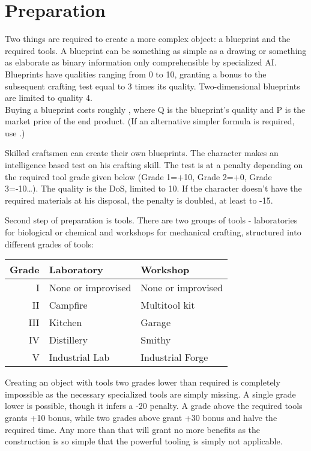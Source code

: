 \documentclass[12pt,a4paper,openany,usenames,dvipsnames]{book}
\begin{document}
	\chapter{Preparation}
	Two things are required to create a more complex object: a blueprint and the required tools.
	A blueprint can be something as simple as a drawing or something as elaborate as binary information only comprehensible by specialized AI. Blueprints have qualities ranging from 0 to 10, granting a bonus to the subsequent crafting test equal to 3 times its quality. Two-dimensional blueprints are limited to quality 4.\\
	Buying a blueprint costs roughly ,
		where Q is the blueprint’s quality and P is the market price of the end product.
	(If an alternative simpler formula is required, use .)\par
	Skilled craftsmen can create their own blueprints. The character makes an intelligence based test on his crafting skill. The test is at a penalty depending on the required tool grade given below (Grade 1=+10, Grade 2=+0, Grade 3=-10…). The quality is the DoS, limited to 10. If the character doesn’t have the required materials at his disposal, the penalty is doubled, at least to -15.\par
	\newpage %
	Second step of preparation is tools.
	There are two groups of tools
		- laboratories for biological or chemical and workshops for mechanical crafting,
		structured into different grades of tools:
	\par
	\begin{tabularx}{\columnwidth}{r|XX}
		Grade & Laboratory & Workshop \\
		\hline
		I & None or improvised & None or improvised \\
		II & Campfire & Multitool kit \\
		III & Kitchen & Garage \\
		IV & Distillery & Smithy \\
		V & Industrial Lab & Industrial Forge
	\end{tabularx}
	\par
	Creating an object with tools two grades lower than required is completely impossible as the necessary specialized tools are simply missing. A single grade lower is possible, though it infers a -20 penalty. A grade above the required tools grants +10 bonus, while two grades above grant +30 bonus and halve the required time. Any more than that will grant no more benefits as the construction is so simple that the powerful tooling is simply not applicable.\\
\end{document}
